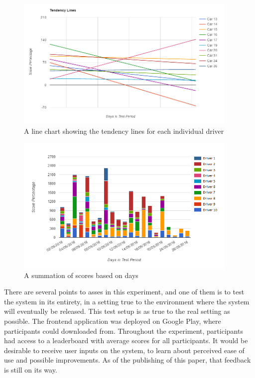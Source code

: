 \begin{figure}[t]
\begin{minipage}{0.95\textwidth}
\centering
\includegraphics[width=0.95\textwidth]{Pictures/tendenslinjer}
\caption{A line chart showing the tendency lines for each individual driver}
\label{fig:tendencylines}
\end{minipage}
\end{figure}
\begin{figure}[t]
\begin{minipage}{0.95\textwidth}
\centering
\includegraphics[width=0.95\textwidth]{Pictures/summationoftripscore}
\caption{A summation of scores based on days}
\label{fig:summationoftripscore}
\end{minipage}
\end{figure}

There are several points to asses in this experiment, and one of them is to test the system in its entirety, in a setting true to the environment where the system will eventually be released. This test setup is as true to the real setting as possible. The frontend application was deployed on Google Play, where participants could downloaded from. Throughout the experiment, participants had access to a leaderboard with average scores for all participants. 
It would be desirable to receive user inputs on the system, to learn about perceived ease of use and possible improvements. As of the publishing of this paper, that feedback is still on its way.

